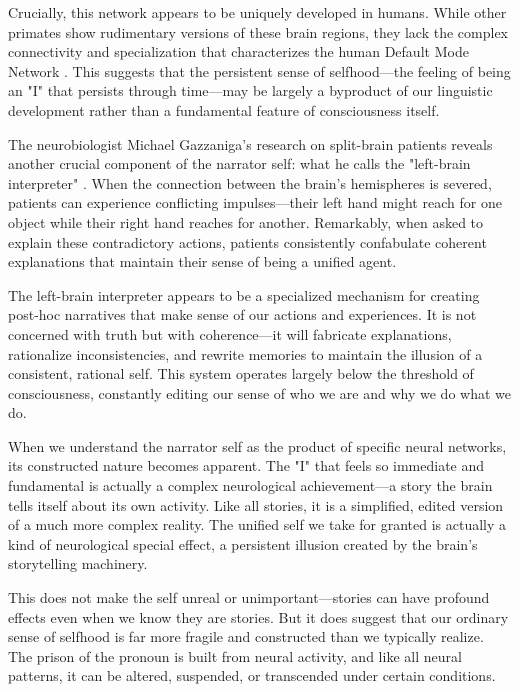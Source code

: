 Crucially, this network appears to be uniquely developed in humans. While other primates show rudimentary versions of these brain regions, they lack the complex connectivity and specialization that characterizes the human Default Mode Network \parencite{mars2013connectivity,schilbach2008minds}. This suggests that the persistent sense of selfhood—the feeling of being an "I" that persists through time—may be largely a byproduct of our linguistic development rather than a fundamental feature of consciousness itself.

The neurobiologist Michael Gazzaniga's research on split-brain patients reveals another crucial component of the narrator self: what he calls the "left-brain interpreter" \parencite{gazzaniga2011who}. When the connection between the brain's hemispheres is severed, patients can experience conflicting impulses—their left hand might reach for one object while their right hand reaches for another. Remarkably, when asked to explain these contradictory actions, patients consistently confabulate coherent explanations that maintain their sense of being a unified agent.

The left-brain interpreter appears to be a specialized mechanism for creating post-hoc narratives that make sense of our actions and experiences. It is not concerned with truth but with coherence—it will fabricate explanations, rationalize inconsistencies, and rewrite memories to maintain the illusion of a consistent, rational self. This system operates largely below the threshold of consciousness, constantly editing our sense of who we are and why we do what we do.

When we understand the narrator self as the product of specific neural networks, its constructed nature becomes apparent. The "I" that feels so immediate and fundamental is actually a complex neurological achievement—a story the brain tells itself about its own activity. Like all stories, it is a simplified, edited version of a much more complex reality. The unified self we take for granted is actually a kind of neurological special effect, a persistent illusion created by the brain's storytelling machinery.

This does not make the self unreal or unimportant—stories can have profound effects even when we know they are stories. But it does suggest that our ordinary sense of selfhood is far more fragile and constructed than we typically realize. The prison of the pronoun is built from neural activity, and like all neural patterns, it can be altered, suspended, or transcended under certain conditions.

